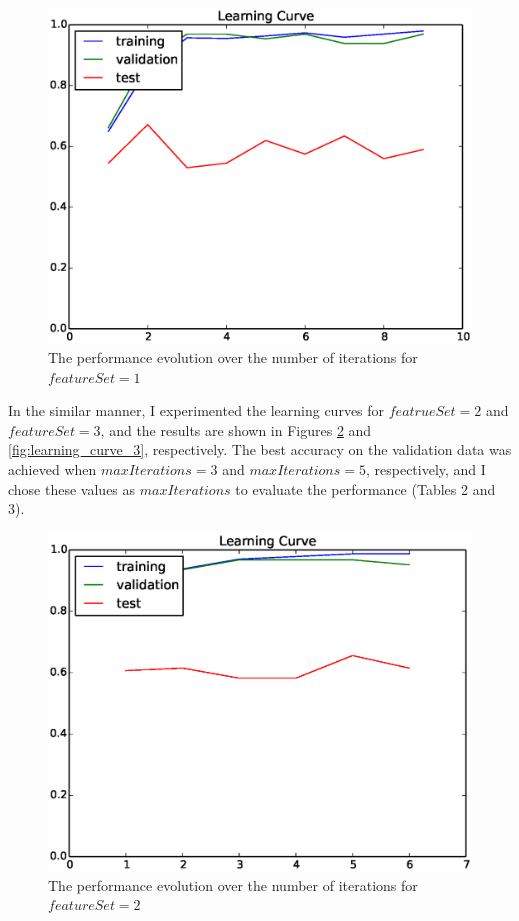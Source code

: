 \begin{figure}[hbtp]
\centering
\includegraphics[width=130mm]{learning_curve_1}
\caption{The performance evolution over the number of iterations for $featureSet=1$}
\label{fig:learning_curve_1}
\end{figure}

In the similar manner, I experimented the learning curves for $featrueSet=2$ and $featureSet=3$, and the results are shown in Figures \ref{fig:learning_curve_2} and \ref{fig:learning_curve_3}, respectively. The best accuracy on the validation data was achieved when $maxIterations=3$ and $maxIterations=5$, respectively, and I chose these values as $maxIterations$ to evaluate the performance (Tables 2 and 3).

\begin{figure}[hbtp]
\centering
\includegraphics[width=130mm]{learning_curve_2}
\caption{The performance evolution over the number of iterations for $featureSet=2$}
\label{fig:learning_curve_2}
\end{figure}


